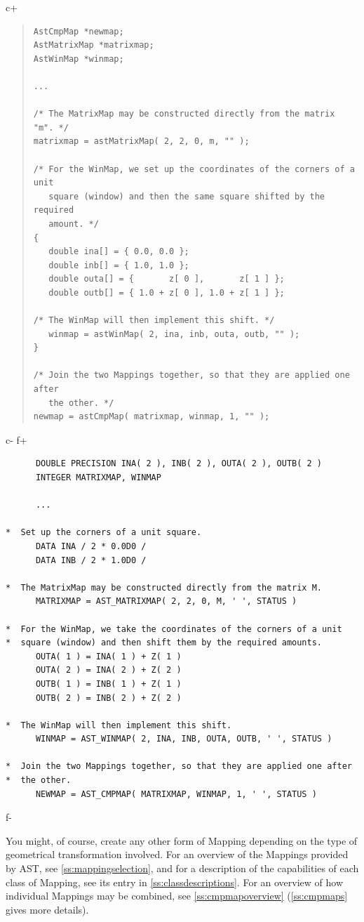 \documentclass[twoside,11pt]{article}
\newcommand{\appref}[1]{Appendix~\ref{#1}}
\newcommand{\secref}[1]{\S\ref{#1}}
\renewcommand{\appref}[1]{\ref{#1}}
\renewcommand{\secref}[1]{\ref{#1}}
\begin{document}
c+
\begin{quote}
\small
\begin{verbatim}
AstCmpMap *newmap;
AstMatrixMap *matrixmap;
AstWinMap *winmap;

...

/* The MatrixMap may be constructed directly from the matrix "m". */
matrixmap = astMatrixMap( 2, 2, 0, m, "" );

/* For the WinMap, we set up the coordinates of the corners of a unit
   square (window) and then the same square shifted by the required
   amount. */
{
   double ina[] = { 0.0, 0.0 };
   double inb[] = { 1.0, 1.0 };
   double outa[] = {       z[ 0 ],       z[ 1 ] };
   double outb[] = { 1.0 + z[ 0 ], 1.0 + z[ 1 ] };

/* The WinMap will then implement this shift. */
   winmap = astWinMap( 2, ina, inb, outa, outb, "" );
}

/* Join the two Mappings together, so that they are applied one after
   the other. */
newmap = astCmpMap( matrixmap, winmap, 1, "" );
\end{verbatim}
\normalsize
\end{quote}
c-
f+
\small
\begin{verbatim}
      DOUBLE PRECISION INA( 2 ), INB( 2 ), OUTA( 2 ), OUTB( 2 )
      INTEGER MATRIXMAP, WINMAP

      ...

*  Set up the corners of a unit square.
      DATA INA / 2 * 0.0D0 /
      DATA INB / 2 * 1.0D0 /

*  The MatrixMap may be constructed directly from the matrix M.
      MATRIXMAP = AST_MATRIXMAP( 2, 2, 0, M, ' ', STATUS )

*  For the WinMap, we take the coordinates of the corners of a unit
*  square (window) and then shift them by the required amounts.
      OUTA( 1 ) = INA( 1 ) + Z( 1 )
      OUTA( 2 ) = INA( 2 ) + Z( 2 )
      OUTB( 1 ) = INB( 1 ) + Z( 1 )
      OUTB( 2 ) = INB( 2 ) + Z( 2 )

*  The WinMap will then implement this shift.
      WINMAP = AST_WINMAP( 2, INA, INB, OUTA, OUTB, ' ', STATUS )

*  Join the two Mappings together, so that they are applied one after
*  the other.
      NEWMAP = AST_CMPMAP( MATRIXMAP, WINMAP, 1, ' ', STATUS )
\end{verbatim}
\normalsize
f-

You might, of course, create any other form of Mapping depending on
the type of geometrical transformation involved. For an overview of
the Mappings provided by AST, see \secref{ss:mappingselection}, and
for a description of the capabilities of each class of Mapping, see
its entry in \appref{ss:classdescriptions}. For an overview of how
individual Mappings may be combined, see \secref{ss:cmpmapoverview}
(\secref{ss:cmpmaps} gives more details).
\end{document}
